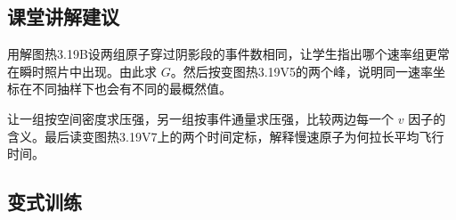 \documentclass[UTF8,fontset=fandol,a4paper,11pt]{ctexart}
\begin{document}


\subsection*{课堂讲解建议}

用解图热3.19B设两组原子穿过阴影段的事件数相同，让学生指出哪个速率组更常在瞬时照片中出现。由此求 $G$。然后按变图热3.19V5的两个峰，说明同一速率坐标在不同抽样下也会有不同的最概然值。

让一组按空间密度求压强，另一组按事件通量求压强，比较两边每一个 $v$ 因子的含义。最后读变图热3.19V7上的两个时间定标，解释慢速原子为何拉长平均飞行时间。



\subsection*{变式训练}
\end{document}
